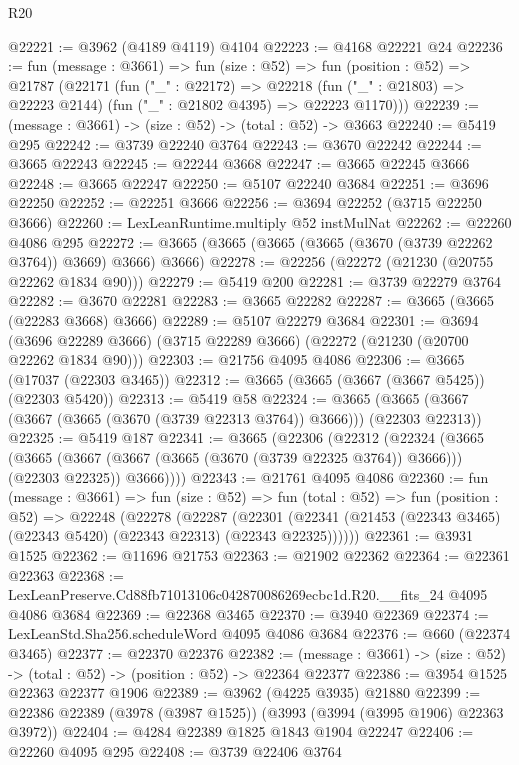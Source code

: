 \begin{lexlean}{R20}
\begin{coremodule}
@22221 := @3962 (@4189 @4119) @4104
@22223 := @4168 @22221 @24
@22236 := fun (message : @3661) =>
  fun (size : @52) =>
  fun (position : @52) =>
  @21787
    (@22171
      (fun ("_" : @22172) =>
      @22218 (fun ("_" : @21803) => @22223 @2144) (fun ("_" : @21802 @4395) => @22223 @1170)))
@22239 := (message : @3661) -> (size : @52) -> (total : @52) -> @3663
@22240 := @5419 @295
@22242 := @3739 @22240 @3764
@22243 := @3670 @22242
@22244 := @3665 @22243
@22245 := @22244 @3668
@22247 := @3665 @22245 @3666
@22248 := @3665 @22247
@22250 := @5107 @22240 @3684
@22251 := @3696 @22250
@22252 := @22251 @3666
@22256 := @3694 @22252 (@3715 @22250 @3666)
@22260 := LexLeanRuntime.multiply @52 instMulNat
@22262 := @22260 @4086 @295
@22272 := @3665 (@3665 (@3665 (@3665 (@3670 (@3739 @22262 @3764)) @3669) @3666) @3666)
@22278 := @22256 (@22272 (@21230 (@20755 @22262 @1834 @90)))
@22279 := @5419 @200
@22281 := @3739 @22279 @3764
@22282 := @3670 @22281
@22283 := @3665 @22282
@22287 := @3665 (@3665 (@22283 @3668) @3666)
@22289 := @5107 @22279 @3684
@22301 := @3694
    (@3696 @22289 @3666)
    (@3715 @22289 @3666)
    (@22272 (@21230 (@20700 @22262 @1834 @90)))
@22303 := @21756 @4095 @4086
@22306 := @3665 (@17037 (@22303 @3465))
@22312 := @3665 (@3665 (@3667 (@3667 @5425)) (@22303 @5420))
@22313 := @5419 @58
@22324 := @3665 (@3665 (@3667 (@3667 (@3665 (@3670 (@3739 @22313 @3764)) @3666))) (@22303 @22313))
@22325 := @5419 @187
@22341 := @3665
    (@22306
      (@22312
        (@22324
          (@3665
            (@3665 (@3667 (@3667 (@3665 (@3670 (@3739 @22325 @3764)) @3666))) (@22303 @22325))
            @3666))))
@22343 := @21761 @4095 @4086
@22360 := fun (message : @3661) =>
  fun (size : @52) =>
  fun (total : @52) =>
  fun (position : @52) =>
  @22248
    (@22278
      (@22287
        (@22301 (@22341 (@21453 (@22343 @3465) (@22343 @5420) (@22343 @22313) (@22343 @22325))))))
@22361 := @3931 @1525
@22362 := @11696 @21753
@22363 := @21902 @22362
@22364 := @22361 @22363
@22368 := LexLeanPreserve.Cd88fb71013106c042870086269ecbc1d.R20.__fits_24 @4095 @4086 @3684
@22369 := @22368 @3465
@22370 := @3940 @22369
@22374 := LexLeanStd.Sha256.scheduleWord @4095 @4086 @3684
@22376 := @660 (@22374 @3465)
@22377 := @22370 @22376
@22382 := (message : @3661) -> (size : @52) -> (total : @52) -> (position : @52) -> @22364 @22377
@22386 := @3954 @1525 @22363 @22377 @1906
@22389 := @3962 (@4225 @3935) @21880
@22399 := @22386 @22389 (@3978 (@3987 @1525)) (@3993 (@3994 (@3995 @1906) @22363 @3972))
@22404 := @4284 @22389 @1825 @1843 @1904 @22247
@22406 := @22260 @4095 @295
@22408 := @3739 @22406 @3764

\end{coremodule}
\end{lexlean}
